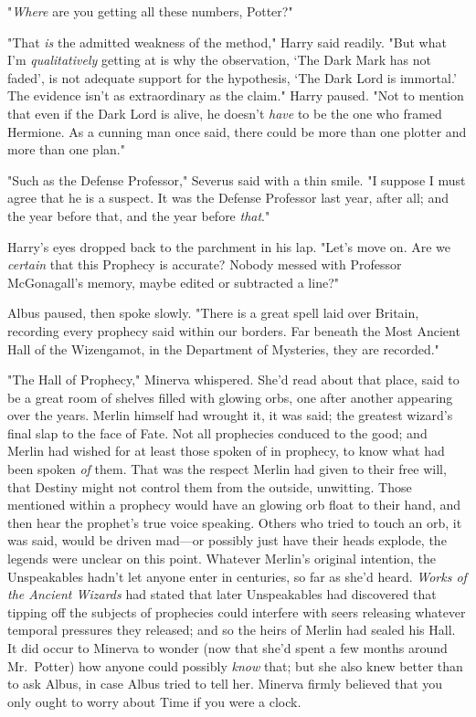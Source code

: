 "\emph{Where} are you getting all these numbers, Potter?"

"That \emph{is} the admitted weakness of the method," Harry said readily. "But 
what I'm \emph{qualitatively} getting at is why the observation, `The Dark Mark 
has not faded', is not adequate support for the hypothesis, `The Dark Lord is 
immortal.' The evidence isn't as extraordinary as the claim." Harry paused. 
"Not to mention that even if the Dark Lord is alive, he doesn't \emph{have} to 
be the one who framed Hermione. As a cunning man once said, there could be more 
than one plotter and more than one plan."

"Such as the Defense Professor," Severus said with a thin smile. "I suppose I 
must agree that he is a suspect. It was the Defense Professor last year, after 
all; and the year before that, and the year before \emph{that}."

Harry's eyes dropped back to the parchment in his lap. "Let's move on. Are 
we \emph{certain} that this Prophecy is accurate? Nobody messed with Professor 
McGonagall's memory, maybe edited or subtracted a line?"

Albus paused, then spoke slowly. "There is a great spell laid over Britain, 
recording every prophecy said within our borders. Far beneath the Most Ancient 
Hall of the Wizengamot, in the Department of Mysteries, they are recorded."

"The Hall of Prophecy," Minerva whispered. She'd read about that place, said to 
be a great room of shelves filled with glowing orbs, one after another 
appearing over the years. Merlin himself had wrought it, it was said; the 
greatest wizard's final slap to the face of Fate. Not all prophecies conduced 
to the good; and Merlin had wished for at least those spoken of in prophecy, to 
know what had been spoken \emph{of} them. That was the respect Merlin had given 
to their free will, that Destiny might not control them from the outside, 
unwitting. Those mentioned within a prophecy would have an glowing orb float to 
their hand, and then hear the prophet's true voice speaking. Others who tried 
to touch an orb, it was said, would be driven mad---or possibly just have their 
heads explode, the legends were unclear on this point. Whatever Merlin's 
original intention, the Unspeakables hadn't let anyone enter in centuries, so 
far as she'd heard. \emph{Works of the Ancient Wizards} had stated that later 
Unspeakables had discovered that tipping off the subjects of prophecies could 
interfere with seers releasing whatever temporal pressures they released; and 
so the heirs of Merlin had sealed his Hall. It did occur to Minerva to wonder 
(now that she'd spent a few months around Mr.~Potter) how anyone could possibly 
\emph{know} that; but she also knew better than to ask Albus, in case Albus 
tried to tell her. Minerva firmly believed that you only ought to worry about 
Time if you were a clock.

